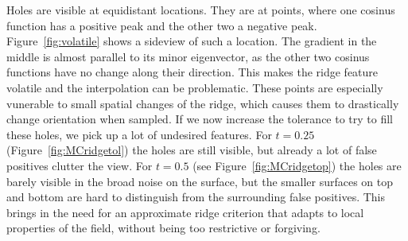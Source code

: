 Holes are visible at equidistant locations. They are at points, where
one cosinus function has a positive peak and the other two a negative
peak. Figure~\ref{fig:volatile} shows a sideview of such a location. The
gradient in the middle is almost parallel to its minor eigenvector, as
the other two cosinus functions have no change along their direction.
This makes the ridge feature volatile and the interpolation can be
problematic. These points are especially vunerable to small spatial
changes of the ridge, which causes them to drastically change
orientation when sampled. If we now increase the tolerance to try to
fill these holes, we pick up a lot of undesired features. For $t=0.25$
(Figure~\ref{fig:MCridgetol}) the holes are still visible, but already a
lot of false positives clutter the view. For $t=0.5$ (see
Figure~\ref{fig:MCridgetop}) the holes are barely visible in the broad
noise on the surface, but the smaller surfaces on top and bottom are
hard to distinguish from the surrounding false positives. This brings in
the need for an approximate ridge criterion that adapts to local
properties of the field, without being too restrictive or forgiving.

